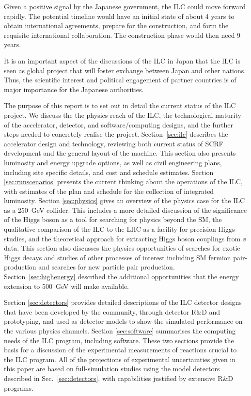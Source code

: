 Given a positive signal by the Japanese government, the ILC could move 
forward rapidly.
The potential timeline would have an initial state of 
about 4 years to obtain
 international agreements, prepare for the  construction, and form 
 the requisite international
collaboration.  The construction phase would then need 9 years.


It is an important aspect of the discussions of the ILC in Japan that the
ILC is seen as global project that will foster exchange between Japan
and other nations.   Thus, the  
scientific interest and political engagement of partner countries is of
major importance
for the Japanese authorities.  

The purpose of this report is to set out in detail the current status
of the ILC project.  We discuss the 
the physics reach of the ILC, the technological maturity of the accelerator,
detector, and software/computing designs,
and the further steps 
 needed to concretely realise the project.  Section~\ref{sec:ilc}
 describes the accelerator design and technology, reviewing both 
 current status of SCRF development and the general layout of the
 machine.  This section also presents luminosity and energy upgrade
 options,  as well as civil engineering plans, including site
 specific details, and cost and schedule estimates.
 Section \ref{sec:runscenarios}  presents the current
 thinking about the operations of the ILC, with estimates of the plan
 and schedule for the 
 collection of integrated luminosity.
 Section \ref{sec:physics} gives an overview of the physics case for
 the ILC as a 250~GeV collider.
 This includes a more detailed discussion of the significance of the Higgs boson 
 as a tool for searching for physics beyond the SM, the qualitative
 comparison of the ILC to the LHC as a facility for precision Higgs
 studies, and the theoretical approach for extracting Higgs boson
 couplings from $\ee$ data.  This section also discusses the physics
 opportunities of searches for exotic Higgs decays and studies of
 other processes of interest including SM fermion pair-production and
 searches for
 new particle pair production. Section~\ref{sec:highenergy} described
 the additional opportunities that the energy extension to 500~GeV
 will make available. 
 
 Section \ref{sec:detectors}
 provides detailed descriptions of the ILC detector designs
 that have been developed by the community,
 through detector R\&D and prototyping, and used as detector
 models to show the simulated performance on the various
 physics channels. Section \ref{sec:software}
 summarises the computing needs of the ILC program,
 including software.  These two sections provide the basis for a
 discussion of the experimental measurements of reactions crucial to
 the ILC program. All of the projections of experimental
 uncertainties given in this paper are based on full-simulation
 studies using the model detectors described in
 Sec.~\ref{sec:detectors},
 with capabilities justified by
 extensive R\&D programs. 

